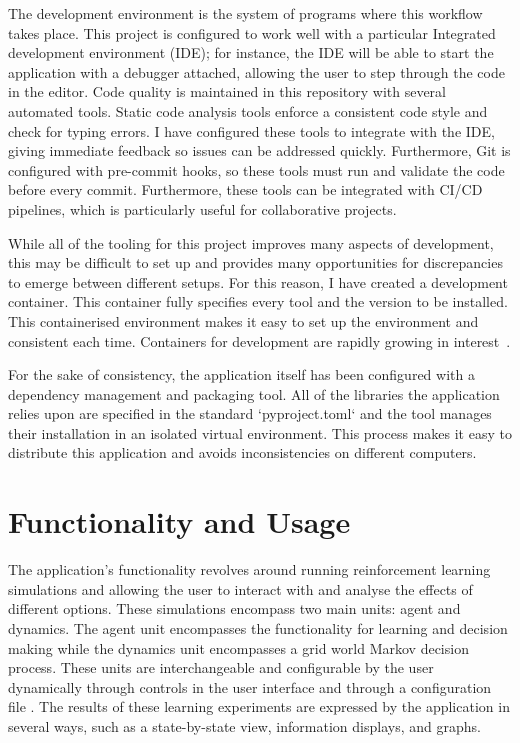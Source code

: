 \documentclass[]{final_report}
\begin{document}
The development environment is the system of programs where this workflow takes place. This project is configured to work well with a particular Integrated development environment (IDE); for instance, the IDE will be able to start the application with a debugger attached, allowing the user to step through the code in the editor. Code quality is maintained in this repository with several automated tools. Static code analysis tools enforce a consistent code style and check for typing errors. I have configured these tools to integrate with the IDE, giving immediate feedback so issues can be addressed quickly. Furthermore, Git is configured with pre-commit hooks, so these tools must run and validate the code before every commit. Furthermore, these tools can be integrated with CI/CD pipelines, which is particularly useful for collaborative projects.

While all of the tooling for this project improves many aspects of development, this may be difficult to set up and provides many opportunities for discrepancies to emerge between different setups. For this reason, I have created a development container. This container fully specifies every tool and the version to be installed. This containerised environment makes it easy to set up the environment and consistent each time. Containers for development are rapidly growing in interest~\cite{developmentContainers}. 

For the sake of consistency, the application itself has been configured with a dependency management and packaging tool. All of the libraries the application relies upon are specified in the standard `pyproject.toml` and the tool manages their installation in an isolated virtual environment. This process makes it easy to distribute this application and avoids inconsistencies on different computers.

\newpage
\section{Functionality and Usage}

The application's functionality revolves around running reinforcement learning simulations and allowing the user to interact with and analyse the effects of different options. These simulations encompass two main units: agent and dynamics. The agent unit encompasses the functionality for learning and decision making while the dynamics unit encompasses a grid world Markov decision process. These units are interchangeable and configurable by the user dynamically through controls in the user interface and through a configuration file . The results of these learning experiments are expressed by the application in several ways, such as a state-by-state view, information displays, and graphs.
\end{document}
